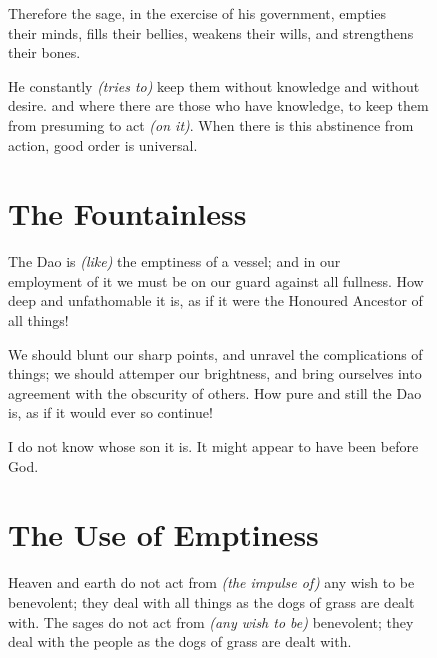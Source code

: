     Therefore the sage, in the exercise of his government, empties\\
    their minds, fills their bellies, weakens their wills, and strengthens\\
    their bones.\vspace{\baselineskip}
    
    He constantly \textit{(tries to)} keep them without knowledge and without\\
    desire. and where there are those who have knowledge, to keep them\\
    from presuming to act \textit{(on it)}. When there is this abstinence from\\
    action, good order is universal.\vspace{\baselineskip}
    
    
\section*{The Fountainless}
    The Dao is \textit{(like)} the emptiness of a vessel; and in our\\
    employment of it we must be on our guard against all fullness. How\\
    deep and unfathomable it is, as if it were the Honoured Ancestor of\\
    all things!\vspace{\baselineskip}
    
    We should blunt our sharp points, and unravel the complications of\\
    things; we should attemper our brightness, and bring ourselves into\\
    agreement with the obscurity of others. How pure and still the Dao\\
    is, as if it would ever so continue!\vspace{\baselineskip}
    
    I do not know whose son it is. It might appear to have been before\\
    God.\vspace{\baselineskip} 
    \newpage
    
\section*{The Use of Emptiness}
    Heaven and earth do not act from \textit{(the impulse of)} any wish to be\\
    benevolent; they deal with all things as the dogs of grass are dealt\\
    with. The sages do not act from \textit{(any wish to be)} benevolent; they\\
    deal with the people as the dogs of grass are dealt with.\vspace{\baselineskip}
    
